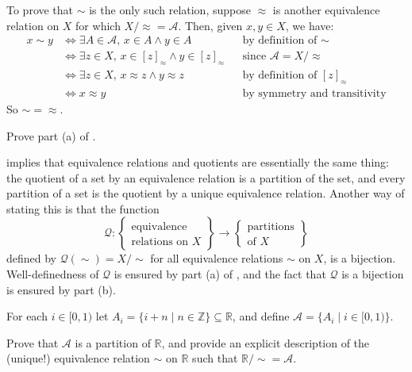 \begin{cproof}[{of (b)}]
To prove that $\sim$ is the only such relation, suppose $\approx$ is another equivalence relation on $X$ for which $X/{\approx}=\mathcal{A}$. Then, given $x,y \in X$, we have:
\begin{align*}
x \sim y & \Leftrightarrow \exists A \in \mathcal{A},\, x \in A \wedge y \in A && \text{by definition of $\sim$} \\
& \Leftrightarrow \exists z \in X,\, x \in [z]_{\approx} \wedge y \in [z]_{\approx} && \text{since $\mathcal{A} = X/{\approx}$} \\
& \Leftrightarrow \exists z \in X,\, x \approx z \wedge y \approx z && \text{by definition of $[z]_{\approx}$} \\
& \Leftrightarrow x \approx y && \text{by symmetry and transitivity}
\end{align*}
So ${\sim} = {\approx}$.
\end{cproof}

\begin{exercise}
\label{exQuotientIsPartition}
Prove part (a) of .
\end{exercise}

 implies that equivalence relations and quotients are essentially the same thing: the quotient of a set by an equivalence relation is a partition of the set, and every partition of a set is the quotient by a unique equivalence relation. Another way of stating this is that the function
\[ \mathcal{Q} : \left\{ \begin{matrix} \text{equivalence} \\ \text{relations on } X \end{matrix} \right\} \to \left\{ \begin{matrix} \text{partitions} \\ \text{of } X \end{matrix} \right\} \]
defined by $\mathcal{Q}(\sim)=X/{\sim}$ for all equivalence relations $\sim$ on $X$, is a bijection. Well-definedness of $\mathcal{Q}$ is ensured by part (a) of , and the fact that $\mathcal{Q}$ is a bijection is ensured by part (b).

\begin{exercise}
For each $i \in [0,1)$ let $A_i = \{ i+n \mid n \in \mathbb{Z} \} \subseteq \mathbb{R}$, and define $\mathcal{A} = \{ A_i \mid i \in [0,1) \}$.

Prove that $\mathcal{A}$ is a partition of $\mathbb{R}$, and provide an explicit description of the (unique!) equivalence relation $\sim$ on $\mathbb{R}$ such that $\mathbb{R}/{\sim} = \mathcal{A}$.
\end{exercise}

